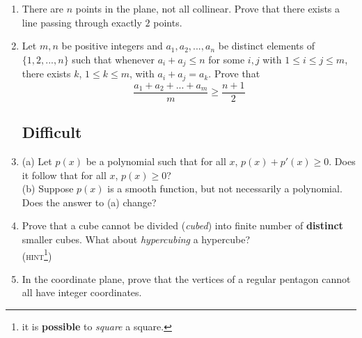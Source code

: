 \documentclass[12pt]{article}
\begin{document}
\begin{enumerate}
	\item{There are $n$ points in the plane, not all collinear. Prove that there exists a line passing through exactly $2$ points.}
	
	\item{Let $m, n$ be positive integers and $a_1, a_2, ..., a_n$ be distinct elements of $\{1, 2, ..., n\}$ such that whenever $a_i + a_j \le n$ for some $i, j$ with $1\le i\le j\le m$, there exists $k$, $1 \le k \le m$, with $a_i + a_j = a_k$. Prove that
	\[\dfrac{a_1 + a_2 + ... + a_m}{m} \ge \dfrac{n+1}{2}\]}

	\subsection*{Difficult}
	\item{(a) Let $p(x)$ be a polynomial such that for all $x$, $p(x) + p'(x) \ge 0$. Does it follow that for all $x$, $p(x) \ge 0$?
\\(b) Suppose $p(x)$ is a smooth function, but not necessarily a polynomial. Does the answer to (a) change?}
	
	\item{Prove that a cube cannot be divided (\emph{cubed}) into finite number of \textbf{distinct} smaller cubes. What about \emph{hypercubing} a hypercube? \\
(\textsc{hint\footnote{it is \textbf{possible} to \emph{square} a square.})}}
	
	\item{In the coordinate plane, prove that the vertices of a regular pentagon cannot all have integer coordinates.}

\end{enumerate}
\end{document}
